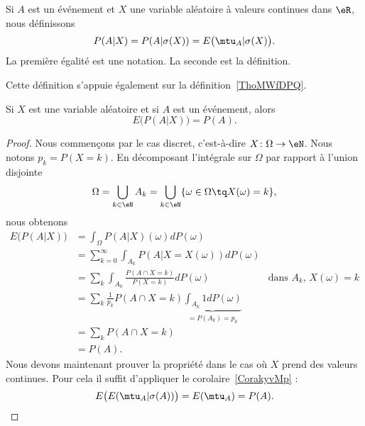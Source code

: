 \begin{definition}      \label{DEFooIUJMooBAVtMW}
	Si \( A\) est un événement et \( X\) une variable aléatoire à valeurs continues dans \( \eR\), nous définissons
	\begin{equation}
		P(A|X)=P(A|\sigma(X))=E\big( \mtu_A|\sigma(X) \big).
	\end{equation}
	La première égalité est une notation. La seconde est la définition.
\end{definition}
Cette définition s'appuie également sur la définition~\ref{ThoMWfDPQ}.

\begin{proposition}
	Si \( X\) est une variable aléatoire et si \( A\) est un événement, alors
	\begin{equation}
		E\big( P(A|X) \big)=P(A).
	\end{equation}
\end{proposition}

\begin{proof}
	Nous commençons par le cas discret, c'est-à-dire \( X\colon \Omega\to \eN\). Nous notons \( p_k=P(X=k)\). En décomposant l'intégrale sur \( \Omega\) par rapport à l'union disjointe
	\begin{equation}
		\Omega=\bigcup_{k\in \eN}A_k=\bigcup_{k\in \eN}\{ \omega\in\Omega \tq X(\omega)=k\},
	\end{equation}
	nous obtenons
	\begin{subequations}
		\begin{align}
			E\big( P(A|X) \big) & =\int_{\Omega}P(A|X)(\omega)dP(\omega)                                                                                     \\
			                    & =\sum_{k=0}^{\infty}\int_{A_k}P(A|X=X(\omega))dP(\omega)                                                                   \\
			                    & =\sum_k\int_{A_k}\frac{ P(A\cap X=k) }{ P(X=k) }dP(\omega)                         & \text{dans } A_k\text{, } X(\omega)=k \\
			                    & =\sum_k\frac{1}{ p_k }P(A\cap X=k)\underbrace{\int_{A_k}1dP(\omega)}_{=P(A_k)=p_k}                                         \\
			                    & =\sum_{k}P(A\cap X=k)                                                                                                      \\
			                    & =P(A).
		\end{align}
	\end{subequations}
	Nous devons maintenant prouver la propriété dans le cas où \( X\) prend des valeurs continues. Pour cela il suffit d'appliquer le corolaire~\ref{CorakyvMp} :
	\begin{equation}
		E\big( E(\mtu_A|\sigma(A)) \big)=E(\mtu_A)=P(A).
	\end{equation}
\end{proof}

